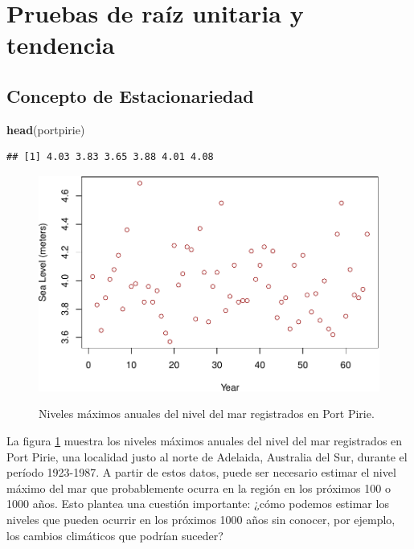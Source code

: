 \documentclass[
  20pt,
]{book}
\newenvironment{Shaded}{\begin{snugshade}}{\end{snugshade}}
\newcommand{\FunctionTok}[1]{\textcolor[rgb]{0.13,0.29,0.53}{\textbf{#1}}}
\newcommand{\NormalTok}[1]{#1}
\theoremstyle{definition}
\theoremstyle{definition}
\theoremstyle{definition}
\theoremstyle{definition}
\theoremstyle{remark}
\begin{document}
\section{Pruebas de raíz unitaria y tendencia}\label{pruebas-de-rauxedz-unitaria-y-tendencia}

\subsection{Concepto de Estacionariedad}\label{concepto-de-estacionariedad}

\begin{Shaded}
\begin{Highlighting}[]
\FunctionTok{head}\NormalTok{(portpirie)}
\end{Highlighting}
\end{Shaded}

\begin{verbatim}
## [1] 4.03 3.83 3.65 3.88 4.01 4.08
\end{verbatim}

\begin{figure}

{\centering \includegraphics[width=0.8\linewidth,alt={Niveles máximos anuales del nivel del mar registrados en Port Pirie, una localidad justo al norte de Adelaida, Australia del Sur, durante el período 1923-1987}]{Extremales_files/figure-latex/nice-fig2-1} 

}

\caption{Niveles máximos anuales del nivel del mar registrados en Port Pirie.}\label{fig:nice-fig2}
\end{figure}

La figura \ref{fig:nice-fig2} muestra los niveles máximos anuales del nivel del mar registrados en Port Pirie, una localidad justo al norte de Adelaida, Australia del Sur, durante el período 1923-1987. A partir de estos datos, puede ser necesario estimar el nivel máximo del mar que probablemente ocurra en la región en los próximos 100 o 1000 años. Esto plantea una cuestión importante: ¿cómo podemos estimar los niveles que pueden ocurrir en los próximos 1000 años sin conocer, por ejemplo, los cambios climáticos que podrían suceder?
\end{document}
